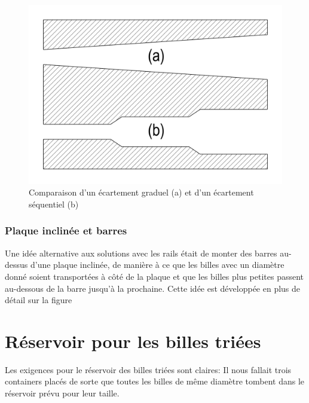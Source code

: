 \begin{figure}
    \centering
    \includegraphics[width=\textwidth]{Graphics/Rails/ECARTEMENTS.pdf}
    \caption{Comparaison d'un écartement graduel (a) et d'un écartement séquentiel (b)}
\end{figure}

\subsubsection{Plaque inclinée et barres}
Une idée alternative aux solutions avec les rails était de monter des barres au-dessus d'une plaque inclinée, de manière à ce que les billes avec un diamètre donné soient transportées à côté de la plaque et que les billes plus petites passent au-dessous de la barre jusqu'à la prochaine. Cette idée est développée en plus de détail sur la figure %



\section{Réservoir pour les billes triées}
Les exigences pour le réservoir des billes triées sont claires: Il nous fallait trois containers placés de sorte que toutes les billes de même diamètre tombent dans le réservoir prévu pour leur taille.


